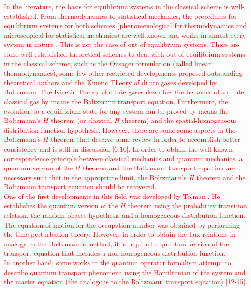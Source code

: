 \documentclass{article}
\begin{document}
\textcolor{red}{In the literature, the basis for equilibrium systems in the classical scheme is well-established. From thermodynamics to statistical mechanics, the procedures for equilibrium systems for both schemes (phenomenological for thermodynamics and microscopical for statistical mechanics) are well-known and works in almost every system in nature \cite{huang, reif, patrick}. This is not the case of out of equilibrium systems. There are some well-established theoretical schemes to deal with out of equilibrium systems in the classical scheme, such as the Onsager formulation (called linear thermodynamics), some few other restricted developments proposed outstanding theoretical authors \cite{kei, onsager} and the Kinetic Theory of dilute gases developed by Boltzmann. The Kinetic Theory of dilute gases describes the behavior of a dilute classical gas by means the Boltzmann transport equation. Furthermore, the evolution to a equilibrium state for any system can be proved by means the Boltzmann's $H$ theorem (or classical $H$ theorem) and the spatial-homogeneous distribution function hypothesis. However, there are some some aspects in the Boltzmann's $H$ theorem that deserve some review in order to accomplish better consistency and is still in discussion [6-10]. %
In order to obtain the well-known correspondence principle between classical mechanics and quantum mechanics, a quantum version of the $H$ theorem and the Boltzmann transport equation are necessary such that in the appropriate limit, the  Boltzmann's $H$ theorem and the Boltzmann transport equation should be recovered.\\
One of the first developments in this field was developed by Tolman \cite{tolman}. He establishes the quantum version of the $H$ theorem using the probability transition relation, the random phases hypothesis and a homogeneous distribution function. The equation of motion for the occupation number was obtained by performing the time perturbation theory. However, in order to obtain the flux relations in analogy to the Boltzmann's method, it is required a quantum version of the transport equation that includes a non-homogeneous distribution function.\\
In another hand, some works in the quantum operator formalism attempt to describe quantum transport phenomena using the Hamiltonian of the system and the master equation (the analogous to the Boltzmann transport equation) [12-15]. %
}
\end{document}

